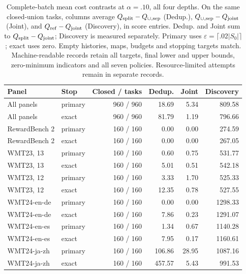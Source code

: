\begin{table}[t]
\centering\small
\begin{tabular}{llrrrr}
\toprule
Panel & Stop & Closed / tasks & Dedup. & Joint & Discovery \\
\midrule
All panels & primary & 960 / 960 & 18.69 & 5.34 & 809.58 \\
All panels & exact & 960 / 960 & 81.79 & 1.19 & 796.66 \\
RewardBench 2 & primary & 160 / 160 & 0.00 & 0.00 & 274.59 \\
RewardBench 2 & exact & 160 / 160 & 0.00 & 0.00 & 267.05 \\
WMT23, 13 & primary & 160 / 160 & 0.60 & 0.75 & 531.77 \\
WMT23, 13 & exact & 160 / 160 & 5.01 & 0.51 & 542.18 \\
WMT23, 12 & primary & 160 / 160 & 3.33 & 1.70 & 525.33 \\
WMT23, 12 & exact & 160 / 160 & 12.35 & 0.78 & 527.55 \\
WMT24-en-de & primary & 160 / 160 & 0.00 & 0.00 & 1298.33 \\
WMT24-en-de & exact & 160 / 160 & 7.86 & 0.23 & 1291.07 \\
WMT24-en-es & primary & 160 / 160 & 1.34 & 0.67 & 1140.28 \\
WMT24-en-es & exact & 160 / 160 & 7.95 & 0.17 & 1160.61 \\
WMT24-ja-zh & primary & 160 / 160 & 106.86 & 28.95 & 1087.16 \\
WMT24-ja-zh & exact & 160 / 160 & 457.57 & 5.43 & 991.53 \\
\bottomrule
\end{tabular}
\caption{Complete-batch mean cost contrasts at $\alpha=.10$, all four depths. On the same closed-union tasks, columns average $Q_{\rm split}-Q_{\cup,\rm sep}$ (Dedup.), $Q_{\cup,\rm sep}-Q_{\rm joint}$ (Joint), and $Q_{\rm ref}-Q_{\rm joint}$ (Discovery), in score entries. Dedup. and Joint sum to $Q_{\rm split}-Q_{\rm joint}$; Discovery is measured separately. Primary uses $\varepsilon=\lceil.02|S_0|\rceil$; exact uses zero. Empty histories, maps, budgets and stopping targets match. Machine-readable records retain all targets, final lower and upper bounds, zero-minimum indicators and all seven policies. Resource-limited attempts remain in separate records.}
\label{tab:cost-contrasts}
\end{table}
